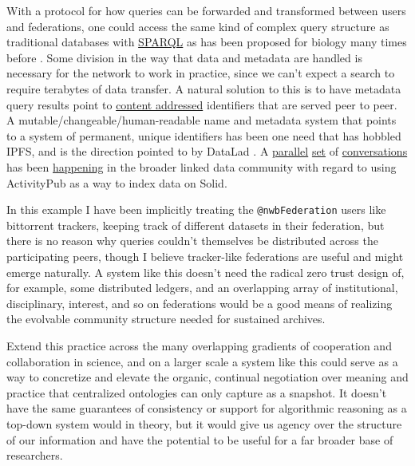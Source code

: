\documentclass[10pt]{tufte-book}
\begin{document}
With a protocol for how queries can be forwarded and transformed between
users and federations, one could access the same kind of complex query
structure as traditional databases with
\href{https://www.w3.org/TR/sparql11-federated-query/}{SPARQL} \citep{SPARQLFederatedQuery2013}  as has been proposed for biology many
times before \citep{simaEnablingSemanticQueries2019, djokic-petrovicPIBASFedSPARQLWebbased2017, hasnainBioFedFederatedQuery2017} . Some division in the way that data
and metadata are handled is necessary for the network to work in
practice, since we can't expect a search to require terabytes of data
transfer. A natural solution to this is to have metadata query results
point to
\href{https://en.wikipedia.org/wiki/Content-addressable_storage}{content
addressed} identifiers that are served peer to peer. A
mutable/changeable/human-readable name and metadata system that points
to a system of permanent, unique identifiers has been one need that has
hobbled IPFS, and is the direction pointed to by DataLad \citep{hankeDefenseDecentralizedResearch2021} . A
\href{https://mastodon.social/@humanetech/107155144840782386}{parallel}
\href{https://web.archive.org/web/20211024082055/https://socialhub.activitypub.rocks/t/which-links-between-activitypub-and-solid-project/529}{set}
of
\href{https://web.archive.org/web/20211024080845/https://socialhub.activitypub.rocks/t/how-solid-and-activitypub-complement-each-other-best/727}{conversations}
has been
\href{https://web.archive.org/web/20211024081238/https://forum.solidproject.org/t/discussion-solid-vs-activitypub/2685}{happening}
in the broader linked data community with regard to using ActivityPub as
a way to index data on Solid.

In this example I have been implicitly treating the
\texttt{@nwbFederation} users like bittorrent trackers, keeping track of
different datasets in their federation, but there is no reason why
queries couldn't themselves be distributed across the participating
peers, though I believe tracker-like federations are useful and might
emerge naturally. A system like this doesn't need the radical zero trust
design of, for example, some distributed ledgers, and an overlapping
array of institutional, disciplinary, interest, and so on federations
would be a good means of realizing the evolvable community structure
needed for sustained archives.

Extend this practice across the many overlapping gradients of
cooperation and collaboration in science, and on a larger scale a system
like this could serve as a way to concretize and elevate the organic,
continual negotiation over meaning and practice that centralized
ontologies can only capture as a snapshot. It doesn't have the same
guarantees of consistency or support for algorithmic reasoning as a
top-down system would in theory, but it would give us agency over the
structure of our information and have the potential to be useful for a
far broader base of researchers.
\end{document}
